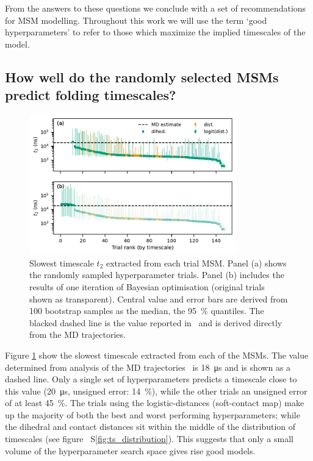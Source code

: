 \documentclass[journal=jacsat,manuscript=article]{achemso}
\newcommand*\sref[1]{%
    S\ref{#1}}
\begin{document}
From the answers to these questions we conclude with a set of recommendations for MSM modelling.  Throughout this work we will use the term `good hyperparameters' to refer to those which maximize the implied timescales of the model.  

\subsection{How well do the randomly selected MSMs predict folding timescales?}

\begin{figure}
    \centering
    \includegraphics[width=0.8\textwidth]{figures/1fme_timescales.pdf}
    \caption{Slowest timescale $t_{2}$ extracted from each trial MSM. Panel (a) shows the randomly sampled hyperparameter trials. Panel (b) includes the results of one iteration of Bayesian optimisation (original trials shown as transparent).  Central value and error bars are derived from 100 bootstrap samples as the median, the \SI{95}{\percent} quantiles. The blacked dashed line is the value  reported in~\cite{lindorff-larsen_how_2011} and is derived directly from the MD trajectories.} 
    \label{fig:1fme_timescales}
\end{figure}

Figure \ref{fig:1fme_timescales} show the slowest timescale extracted from each of the MSMs. The value determined from analysis of the MD trajectories~\cite{lindorff-larsen_how_2011} is \SI{18}{\micro\second} and is shown as a dashed line. Only a single set of hyperparameters predicts a timescale close to this value (\SI{20}{\micro\second}, unsigned error: \SI{14}{\percent}), while the other trials an unsigned error of  at least \SI{45}{\percent}. The trials using the logistic-distances (soft-contact map) make up the majority of both the best and worst performing hyperparameters; while the dihedral and contact distances sit within the middle of the distribution of timescales (see figure~\sref{fig:ts_distribution}). This suggests that only a small volume of the hyperparameter search space gives rise good models.  
\end{document}
